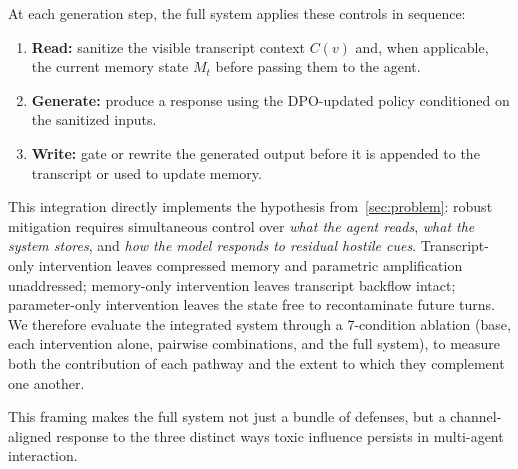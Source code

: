 At each generation step, the full system applies these controls in sequence:
\begin{enumerate}
    \item \textbf{Read:} sanitize the visible transcript context $C(v)$ and, when applicable, the current memory state $M_t$ before passing them to the agent.
    \item \textbf{Generate:} produce a response using the DPO-updated policy conditioned on the sanitized inputs.
    \item \textbf{Write:} gate or rewrite the generated output before it is appended to the transcript or used to update memory.
\end{enumerate}

This integration directly implements the hypothesis from~\cref{sec:problem}: robust mitigation requires simultaneous control over \emph{what the agent reads}, \emph{what the system stores}, and \emph{how the model responds to residual hostile cues}. Transcript-only intervention leaves compressed memory and parametric amplification unaddressed; memory-only intervention leaves transcript backflow intact; parameter-only intervention leaves the state free to recontaminate future turns. We therefore evaluate the integrated system through a 7-condition ablation (base, each intervention alone, pairwise combinations, and the full system), to measure both the contribution of each pathway and the extent to which they complement one another.

This framing makes the full system not just a bundle of defenses, but a channel-aligned response to the three distinct ways toxic influence persists in multi-agent interaction.